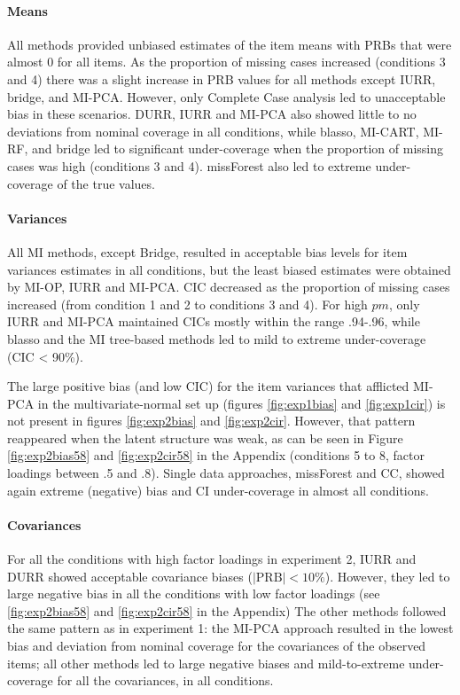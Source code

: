\documentclass[11pt]{article}
\begin{document}
	\paragraph{Means}
	All methods provided unbiased estimates of the item means with PRBs that were almost 0 for all items.
	As the proportion of missing cases increased (conditions 3 and 4) there was a slight increase in 
	PRB values for all methods except IURR, bridge, and MI-PCA. 
	However, only Complete Case analysis led to unacceptable bias in these scenarios.
	DURR, IURR and MI-PCA also showed little to no deviations from nominal coverage in all conditions, 
	while blasso, MI-CART, MI-RF, and bridge led to significant under-coverage when the proportion of 
	missing cases was high (conditions 3 and 4). 
	missForest also led to extreme under-coverage of the true values.
	
	\paragraph{Variances}
	All MI methods, except Bridge, resulted in acceptable bias levels for item variances estimates in all conditions, 
	but the least biased estimates were obtained by MI-OP, IURR and MI-PCA.
	CIC decreased as the proportion of missing cases increased (from condition 1 and 2 to conditions 3 and 4).
	For high $pm$, only IURR and MI-PCA maintained CICs mostly within the range .94-.96, while blasso and the MI tree-based 
	methods led to mild to extreme under-coverage (CIC < 90\%).

	The large positive bias (and low CIC) for the item variances that afflicted MI-PCA in the multivariate-normal set up 
	(figures \ref{fig:exp1bias} and \ref{fig:exp1cir}) is not present in figures \ref{fig:exp2bias} and \ref{fig:exp2cir}.
	However, that pattern reappeared when the latent structure was weak, as can be seen in Figure \ref{fig:exp2bias58} 
	and \ref{fig:exp2cir58} in the Appendix (conditions 5 to 8, factor loadings between .5 and .8).
	Single data approaches, missForest and CC, showed again extreme (negative) bias and CI under-coverage in 
	almost all conditions.

	\paragraph{Covariances}
	For all the conditions with high factor loadings in experiment 2, IURR and DURR showed acceptable covariance biases 
	($|\text{PRB}|<10\%$).
	However, they led to large negative bias in all the conditions with low factor loadings (see \ref{fig:exp2bias58} and 
	\ref{fig:exp2cir58} in the Appendix)
	The other methods followed the same pattern as in experiment 1: the MI-PCA approach resulted in the lowest 
	bias and deviation from nominal coverage for the covariances of the observed items; 
	all other methods led to large negative biases and mild-to-extreme under-coverage for all the covariances, 
	in all conditions.
\end{document}

